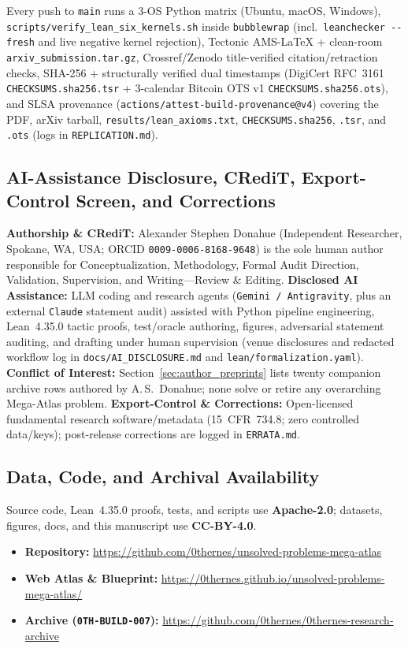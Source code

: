 \documentclass[11pt,reqno]{amsart}
\theoremstyle{plain}
\theoremstyle{definition}
\newcommand{\code}[1]{{\footnotesize\nolinkurl{#1}}}
\begin{document}
\noindent Every push to \code{main} runs a $3$-OS Python matrix (Ubuntu, macOS, Windows), \code{scripts/verify_lean_six_kernels.sh} inside \code{bubblewrap} (incl.\ \code{leanchecker --fresh} and live negative kernel rejection), Tectonic AMS-LaTeX + clean-room \code{arxiv_submission.tar.gz}, Crossref/Zenodo title-verified citation/retraction checks, SHA-256 + structurally verified dual timestamps (DigiCert RFC~3161 \code{CHECKSUMS.sha256.tsr} + $3$-calendar Bitcoin OTS v1 \code{CHECKSUMS.sha256.ots}), and SLSA provenance (\code{actions/attest-build-provenance@v4}) covering the PDF, arXiv tarball, \code{results/lean_axioms.txt}, \code{CHECKSUMS.sha256}, \code{.tsr}, and \code{.ots} (logs in \code{REPLICATION.md}).

\subsection{AI-Assistance Disclosure, CRediT, Export-Control Screen, and Corrections}
\textbf{Authorship \& CRediT:} Alexander Stephen Donahue (Independent Researcher, Spokane, WA, USA; ORCID \code{0009-0006-8168-9648}) is the sole human author responsible for Conceptualization, Methodology, Formal Audit Direction, Validation, Supervision, and Writing---Review \& Editing. \textbf{Disclosed AI Assistance:} LLM coding and research agents (\code{Gemini / Antigravity}, plus an external \code{Claude} statement audit) assisted with Python pipeline engineering, Lean~4.35.0 tactic proofs, test/oracle authoring, figures, adversarial statement auditing, and drafting under human supervision (venue disclosures and redacted workflow log in \code{docs/AI_DISCLOSURE.md} and \code{lean/formalization.yaml}). \textbf{Conflict of Interest:} Section~\ref{sec:author_preprints} lists twenty companion archive rows authored by A.\,S.~Donahue; none solve or retire any overarching Mega-Atlas problem. \textbf{Export-Control \& Corrections:} Open-licensed fundamental research software/metadata (15~CFR~734.8; zero controlled data/keys); post-release corrections are logged in \code{ERRATA.md}.

\subsection{Data, Code, and Archival Availability}
Source code, Lean~4.35.0 proofs, tests, and scripts use \textbf{Apache-2.0}; datasets, figures, docs, and this manuscript use \textbf{CC-BY-4.0}.
\begin{itemize}[leftmargin=1.5em,noitemsep,topsep=1pt]
  \item \textbf{Repository:} \url{https://github.com/0thernes/unsolved-problems-mega-atlas}
  \item \textbf{Web Atlas \& Blueprint:} \url{https://0thernes.github.io/unsolved-problems-mega-atlas/}
  \item \textbf{Archive (\code{0TH-BUILD-007}):} \url{https://github.com/0thernes/0thernes-research-archive}
\end{itemize}

\FloatBarrier


\end{document}

